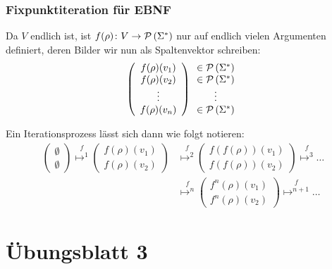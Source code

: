 \documentclass{beamer}
\begin{document}
\begin{frame} \frametitle{Fixpunktiteration für EBNF}
	Da $V$ endlich ist, ist $f(\rho) \colon V \to \mathcal{P}\left( \Sigma^\ast \right)$ nur auf endlich vielen Argumenten definiert, deren Bilder wir nun als Spaltenvektor schreiben:
	\begin{equation*}
		\left(
		\begin{array}{c}
			f(\rho)(v_1) \\
			f(\rho)(v_2) \\
			\vdots \\
			f(\rho)(v_n)
		\end{array}
		\right)
		\begin{array}{c}
			\in \mathcal{P}\left( \Sigma^\ast \right) \\
			\in \mathcal{P}\left( \Sigma^\ast \right) \\
			\vdots \\
			\in \mathcal{P}\left( \Sigma^\ast \right)
		\end{array}
	\end{equation*}
	
	\pause
	Ein Iterationsprozess lässt sich dann wie folgt notieren:
	\begin{align*}
		\begin{pmatrix} \emptyset \\ \emptyset \end{pmatrix}
		\overset{f}{\mapsto^1}
		\begin{pmatrix} f(\rho)(v_1) \\ f(\rho)(v_2) \end{pmatrix}
		&\overset{f}{\mapsto^2}
		\begin{pmatrix} f(f(\rho))(v_1) \\ f(f(\rho))(v_2) \end{pmatrix}
		\overset{f}{\mapsto^3}
		\dots \\
		&\overset{f}{\mapsto^n}
		\begin{pmatrix} f^n(\rho)(v_1) \\ f^n(\rho)(v_2) \end{pmatrix}
		\overset{f}{\mapsto^{n+1}}
		\dots
	\end{align*}
	
\end{frame}

\section{Übungsblatt 3}
\end{document}
